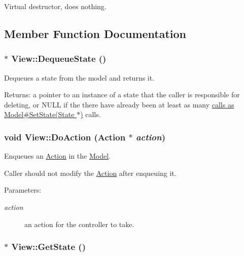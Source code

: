 Virtual destructor, does nothing. 



\subsection{Member Function Documentation}
\hypertarget{classView_8d0521fb0bd96564906deab7fb58d411}{
\subsubsection[{DequeueState}]{ $\ast$ View::DequeueState ()}}
\label{classView_8d0521fb0bd96564906deab7fb58d411}


Dequeues a state from the model and returns it. 

\begin{Desc}
\item[Returns:]a pointer to an instance of a state that the caller is responsible for deleting, or NULL if the there have already been at least as many \hyperlink{classModel_a92abd0332df9f768033423b0cd8b3ae}{calls as  Model\#SetState(State $\ast$)} calls. \end{Desc}
\hypertarget{classView_cb2535000de204a5e4202c6ecce64666}{
\subsubsection[{DoAction}]{\setlength{\rightskip}{0pt plus 5cm}void View::DoAction ({\bf Action} $\ast$ {\em action})}}
\label{classView_cb2535000de204a5e4202c6ecce64666}


Enqueues an \hyperlink{classAction}{Action} in the \hyperlink{classModel}{Model}. 

Caller should not modify the \hyperlink{classAction}{Action} after enqueuing it. \begin{Desc}
\item[Parameters:]
\begin{description}
\item[{\em action}]an action for the controller to take. \end{description}
\end{Desc}
\hypertarget{classView_b766758f8cf0667f20305f5b52cbe64e}{
\subsubsection[{GetState}]{ $\ast$ View::GetState ()}}
\label{classView_b766758f8cf0667f20305f5b52cbe64e}


